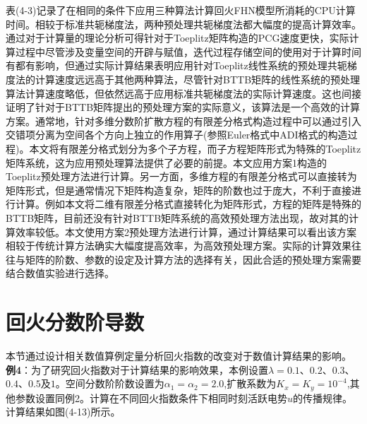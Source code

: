 \documentclass[twoside,UTF8]{nputhesis}
\begin{document}
表(4-3)记录了在相同的条件下应用三种算法计算回火FHN模型所消耗的CPU计算时间。相较于标准共轭梯度法，两种预处理共轭梯度法都大幅度的提高计算效率。通过对于计算量的理论分析可得针对于Toeplitz矩阵构造的PCG速度更快，实际计算过程中尽管涉及变量空间的开辟与赋值，迭代过程存储空间的使用对于计算时间有都有影响，但通过实际计算结果表明应用针对Toeplitz线性系统的预处理共轭梯度法的计算速度远远高于其他两种算法，尽管针对BTTB矩阵的线性系统的预处理算法计算速度略低，但依然远高于应用标准共轭梯度法的实际计算速度。这也间接证明了针对于BTTB矩阵提出的预处理方案的实际意义，该算法是一个高效的计算方案。通常地，针对多维分数阶扩散方程的有限差分格式构造过程中可以通过引入交错项分离为空间各个方向上独立的作用算子(参照Euler格式中ADI格式的构造过程)。本文将有限差分格式划分为多个子方程，而子方程矩阵形式为特殊的Toeplitz矩阵系统，这为应用预处理算法提供了必要的前提。本文应用方案1构造的Toeplitz预处理方法进行计算。另一方面，多维方程的有限差分格式可以直接转为矩阵形式，但是通常情况下矩阵构造复杂，矩阵的阶数也过于庞大，不利于直接进行计算。例如本文将二维有限差分格式直接转化为矩阵形式，方程的矩阵是特殊的BTTB矩阵，目前还没有针对BTTB矩阵系统的高效预处理方法出现，故对其的计算效率较低。本文使用方案2预处理方法进行计算，通过计算结果可以看出该方案相较于传统计算方法确实大幅度提高效率，为高效预处理方案。实际的计算效果往往与矩阵的阶数、参数的设定及计算方法的选择有关，因此合适的预处理方案需要结合数值实验进行选择。\\

\section{回火分数阶导数}
本节通过设计相关数值算例定量分析回火指数的改变对于数值计算结果的影响。\\
\noindent   %
\textbf{例4}：为了研究回火指数对于计算结果的影响效果，本例设置$\lambda =0.1$、$0.2$、$0.3$、$0.4$、$0.5$及$1$。空间分数阶阶数设置为$\alpha_{1}=\alpha_{2}=2.0$,扩散系数为${{K}_{x}}={{K}_{y}}={{10}^{-4}}$,其他参数设置同例2。计算在不同回火指数条件下相同时刻活跃电势$u$的传播规律。计算结果如图(4-13)所示。
\end{document}
